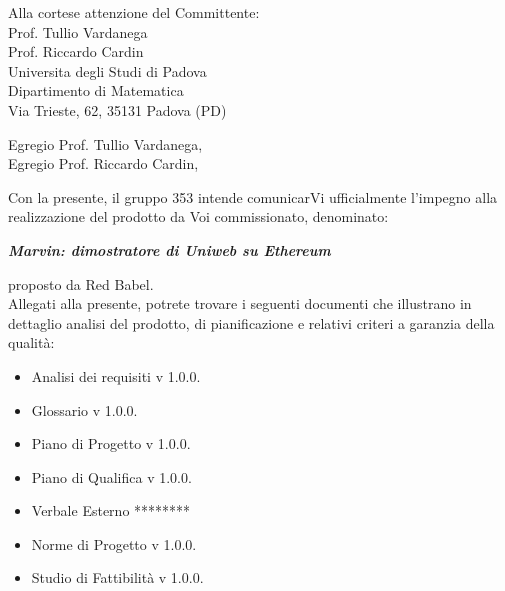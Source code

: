 \documentclass[openany, a4paper, 12pt]{letter}
\newcommand{\citGloss}[1]{ \glsadd{#1} #1\ped{G}}
\begin{document}
	
	\begin{letter}{
			Alla cortese attenzione del Committente:\\
			\smallskip
			Prof. Tullio Vardanega\\
			Prof. Riccardo Cardin\\
			\medskip
			Universita degli Studi di Padova \\
			Dipartimento di Matematica\\
			Via Trieste, 62, 35131 Padova (PD)}
			\opening{Egregio Prof. Tullio Vardanega, \\
				Egregio Prof. Riccardo Cardin,}
			Con la presente, il gruppo 353 intende comunicarVi ufficialmente l’impegno alla realizzazione del
			prodotto da Voi commissionato, denominato: \\
			\begin{center}
			\emph{\textbf{Marvin: dimostratore di Uniweb su Ethereum}}\medskip \\
			\end{center}
			proposto da Red Babel.\medskip\\
			Allegati alla presente, potrete trovare i seguenti documenti che illustrano in dettaglio analisi del
			prodotto, di pianificazione e relativi criteri a garanzia della qualità: 
			\begin{itemize}
				\item Analisi dei \citGloss{requisiti} v 1.0.0.
				\item Glossario v 1.0.0.
				\item Piano di Progetto v 1.0.0.
				\item Piano di Qualifica v 1.0.0.
				\item Verbale Esterno ********%
				\item Norme di Progetto v 1.0.0.
				\item Studio di Fattibilità v 1.0.0.
				\end{itemize}
			
			\thispagestyle{firstpage}
			\newpage
			

\end{letter}
\end{document}
